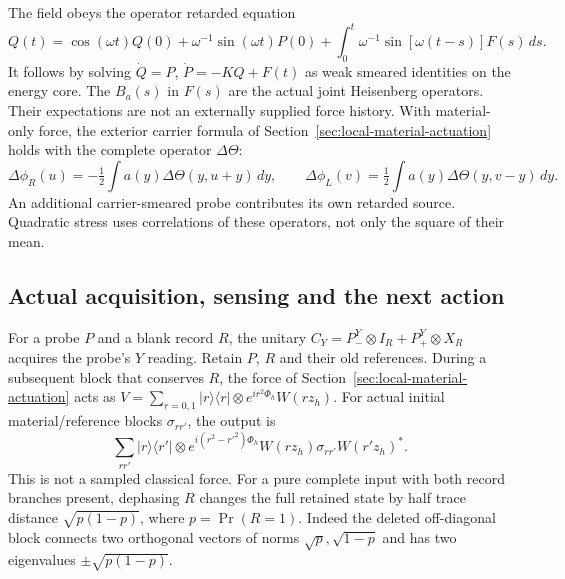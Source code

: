 The field obeys the operator retarded equation
\begin{equation}
 Q(t)=\cos(\omega t)Q(0)+\omega^{-1}\sin(\omega t)P(0)
       +\int_0^t\omega^{-1}\sin[\omega(t-s)]F(s)\,ds .
 \label{eq:quantum-material-retarded}
\end{equation}
It follows by solving $\dot Q=P$, $\dot P=-KQ+F(t)$ as weak
smeared identities on the energy core. The $B_a(s)$ in $F(s)$ are
the actual joint Heisenberg operators. Their expectations are not an
externally supplied force history. With material-only force, the exterior
carrier formula of Section~\ref{sec:local-material-actuation} holds
with the complete operator $\Delta\Theta$:
\[
 \Delta\phi_R(u)=-\tfrac12\int a(y)\Delta\Theta(y,u+y)\,dy,\qquad
 \Delta\phi_L(v)=\tfrac12\int a(y)\Delta\Theta(y,v-y)\,dy .
\]
An additional carrier-smeared probe contributes its own retarded source.
Quadratic stress uses correlations of these operators, not only the
square of their mean.

\subsection{Actual acquisition, sensing and the next action}

For a probe $P$ and a blank record $R$, the unitary
$C_Y=P_-^Y\otimes I_R+P_+^Y\otimes X_R$ acquires the probe's
$Y$ reading. Retain $P$, $R$ and their old references.
During a subsequent block that conserves $R$, the force of
Section~\ref{sec:local-material-actuation} acts as
$V=\sum_{r=0,1}|r\rangle\langle r|\otimes
e^{ir^2\Phi_h}W(rz_h)$. For actual initial material/reference blocks
$\sigma_{rr'}$, the output is
\begin{equation}
 \sum_{rr'} |r\rangle\langle r'|\otimes
 e^{i(r^2-r'^2)\Phi_h}
 W(rz_h)\sigma_{rr'}W(r'z_h)^* .
 \label{eq:quantum-record-blocks}
\end{equation}
This is not a sampled classical force. For a pure complete input with
both record branches present, dephasing $R$ changes the full retained
state by half trace distance $\sqrt{p(1-p)}$, where $p=\Pr(R=1)$.
Indeed the deleted off-diagonal block connects two orthogonal vectors
of norms $\sqrt p,\sqrt{1-p}$ and has two eigenvalues
$\pm\sqrt{p(1-p)}$.

